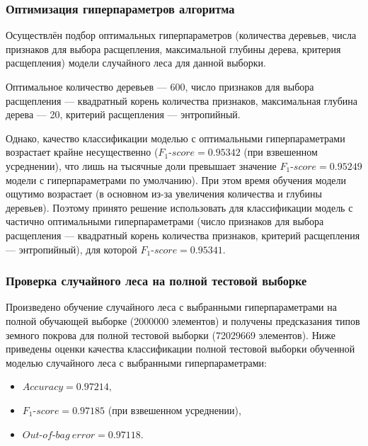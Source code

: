 \documentclass[14pt, a4paper, oneside]{extarticle}
\begin{document}
\subsubsection{Оптимизация гиперпараметров алгоритма}
Осуществлён подбор оптимальных гиперпараметров (количества деревьев, числа признаков для выбора расщепления, максимальной глубины дерева, критерия расщепления) модели случайного леса для данной выборки.

Оптимальное количество деревьев --- 600, число признаков для выбора расщепления --- квадратный корень количества признаков, максимальная глубина дерева --- 20, критерий расщепления --- энтропийный.

Однако, качество классификации моделью с оптимальными гиперпараметрами возрастает крайне несущественно ($F_1\mbox{-}score = 0.95342$ (при взвешенном усреднении), что лишь на тысячные доли превышает значение $F_1\mbox{-}score = 0.95249$ модели с гиперпараметрами по умолчанию). При этом время обучения модели ощутимо возрастает (в основном из-за увеличения количества и глубины деревьев). Поэтому принято решение использовать для классификации модель с частично оптимальными гиперпараметрами (число признаков для выбора расщепления --- квадратный корень количества признаков, критерий расщепления --- энтропийный), для которой $F_1\mbox{-}score = 0.95341$.

\subsubsection{Проверка случайного леса на полной тестовой выборке}
Произведено обучение случайного леса с выбранными гиперпараметрами на полной обучающей выборке (2000000 элементов) и получены предсказания типов земного покрова для полной тестовой выборки (72029669 элементов). Ниже приведены оценки качества классификации полной тестовой выборки обученной моделью случайного леса с выбранными гиперпараметрами:
\begin{itemize}
    \item[] $Accuracy = 0.97214,$
    \item[] $F_1\mbox{-}score = 0.97185$ (при взвешенном усреднении),
    \item[] $Out\mbox{-}of\mbox{-}bag\ error = 0.97118.$
\end{itemize}
\end{document}

